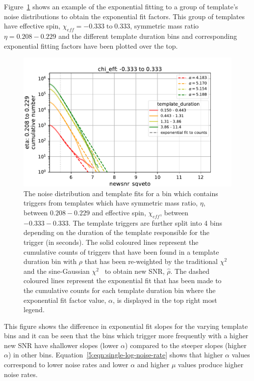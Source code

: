 Figure~\ref{5:fig:template-fits} shows an example of the exponential fitting to a group of template's noise distributions to obtain the exponential fit factors. This group of templates have effective spin, $\chi_{eff} = -0.333 \; \text{to} \; 0.333$, symmetric mass ratio $\eta = 0.208 - 0.229$ and the different template duration bins and corresponding exponential fitting factors have been plotted over the top.
%
\begin{figure}
    \centering
    \includegraphics[width=1.0\textwidth]{images/5_pycbclive/plots/fit_plot.pdf}
    \caption{The noise distribution and template fits for a bin which contains triggers from templates which have symmetric mass ratio, $\eta$, between $0.208 - 0.229$ and effective spin, $\chi_{eff}$, between $-0.333 - 0.333$. The template triggers are further split into 4 bins depending on the duration of the template responsible for the trigger (in seconds). The solid coloured lines represent the cumulative counts of triggers that have been found in a template duration bin with $\rho$ that has been re-weighted by the traditional $\chi^{2}$~\cite{Allen_Chi:2005} and the sine-Gaussian $\chi^{2}$~\cite{PyCBC_sg:2018} to obtain new SNR, $\hat{\rho}$. The dashed coloured lines represent the exponential fit that has been made to the cumulative counts for each template duration bin where the exponential fit factor value, $\alpha$, is displayed in the top right most legend.}
    \label{5:fig:template-fits}
\end{figure}
%
This figure shows the difference in exponential fit slopes for the varying template bins and it can be seen that the bins which trigger more frequently with a higher new SNR have shallower slopes (lower $\alpha$) compared to the steeper slopes (higher $\alpha$) in other bins. Equation~\ref{5:eqn:single-log-noise-rate} shows that higher $\alpha$ values correspond to lower noise rates and lower $\alpha$ and higher $\mu$ values produce higher noise rates.

